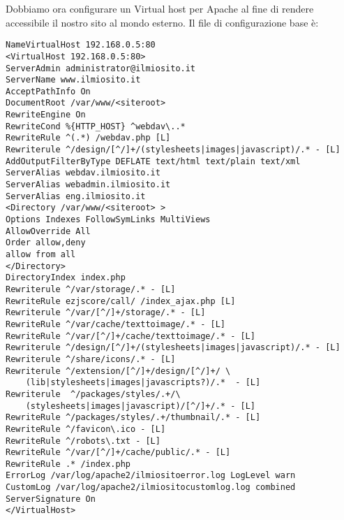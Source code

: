 Dobbiamo ora configurare un Virtual host per Apache al fine di rendere accessibile il nostro sito al mondo esterno. Il file di configurazione base è:
\begin{verbatim}
NameVirtualHost 192.168.0.5:80
<VirtualHost 192.168.0.5:80>
ServerAdmin administrator@ilmiosito.it
ServerName www.ilmiosito.it
AcceptPathInfo On
DocumentRoot /var/www/<siteroot>
RewriteEngine On
RewriteCond %{HTTP_HOST} ^webdav\..*
RewriteRule ^(.*) /webdav.php [L]
Rewriterule ^/design/[^/]+/(stylesheets|images|javascript)/.* - [L]
AddOutputFilterByType DEFLATE text/html text/plain text/xml
ServerAlias webdav.ilmiosito.it
ServerAlias webadmin.ilmiosito.it
ServerAlias eng.ilmiosito.it
<Directory /var/www/<siteroot> >
Options Indexes FollowSymLinks MultiViews
AllowOverride All
Order allow,deny
allow from all
</Directory>
DirectoryIndex index.php
Rewriterule ^/var/storage/.* - [L]
RewriteRule ezjscore/call/ /index_ajax.php [L]
Rewriterule ^/var/[^/]+/storage/.* - [L]
RewriteRule ^/var/cache/texttoimage/.* - [L]
RewriteRule ^/var/[^/]+/cache/texttoimage/.* - [L]
Rewriterule ^/design/[^/]+/(stylesheets|images|javascript)/.* - [L]
Rewriterule ^/share/icons/.* - [L]
Rewriterule ^/extension/[^/]+/design/[^/]+/ \
	(lib|stylesheets|images|javascripts?)/.*  - [L]
Rewriterule  ^/packages/styles/.+/\ 
	(stylesheets|images|javascript)/[^/]+/.* - [L]
RewriteRule ^/packages/styles/.+/thumbnail/.* - [L]
RewriteRule ^/favicon\.ico - [L]
RewriteRule ^/robots\.txt - [L]
RewriteRule ^/var/[^/]+/cache/public/.* - [L]
RewriteRule .* /index.php
ErrorLog /var/log/apache2/ilmiositoerror.log LogLevel warn
CustomLog /var/log/apache2/ilmiositocustomlog.log combined
ServerSignature On
</VirtualHost>
\end{verbatim}







